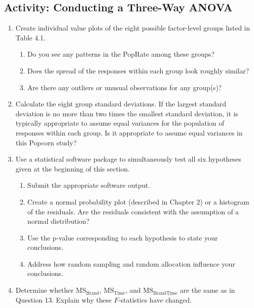 \documentclass[
]{report}
\providecommand{\tightlist}{%
  \setlength{\itemsep}{0pt}\setlength{\parskip}{0pt}}
\theoremstyle{definition}
\theoremstyle{definition}
\theoremstyle{definition}
\theoremstyle{definition}
\theoremstyle{remark}
\begin{document}
\hypertarget{activity-conducting-a-three-way-anova}{%
\subsection{Activity: Conducting a Three-Way ANOVA}\label{activity-conducting-a-three-way-anova}}

\begin{enumerate}
\def\labelenumi{\arabic{enumi}.}
\setcounter{enumi}{15}
\tightlist
\item
  Create individual value plots of the eight possible factor-level groups listed in Table 4.1.

  \begin{enumerate}
  \def\labelenumii{\alph{enumii}.}
  \tightlist
  \item
    Do you see any patterns in the PopRate among these groups?
  \item
    Does the spread of the responses within each group look roughly similar?
  \item
    Are there any outliers or unusual observations for any group(s)?
  \end{enumerate}
\item
  Calculate the eight group standard deviations. If the largest standard deviation is no more than two
  times the smallest standard deviation, it is typically appropriate to assume equal variances for the
  population of responses within each group. Is it appropriate to assume equal variances in this Popcorn
  study?
\item
  Use a statistical software package to simultaneously test all six hypotheses given at the beginning of
  this section.

  \begin{enumerate}
  \def\labelenumii{\alph{enumii}.}
  \tightlist
  \item
    Submit the appropriate software output.
  \item
    Create a normal probability plot (described in Chapter 2) or a histogram of the residuals. Are the
    residuals consistent with the assumption of a normal distribution?
  \item
    Use the p-value corresponding to each hypothesis to state your conclusions.
  \item
    Address how random sampling and random allocation influence your conclusions.
  \end{enumerate}
\item
  Determine whether \(\mathrm{MS}_{\mathrm{Brand}}\), \(\mathrm{MS}_{\mathrm{Time}}\), and \(\mathrm{MS}_{\mathrm{BrandTime}}\) are the same as in Question 13. Explain why these \(F\)-statistics have changed.
\end{enumerate}
\end{document}
